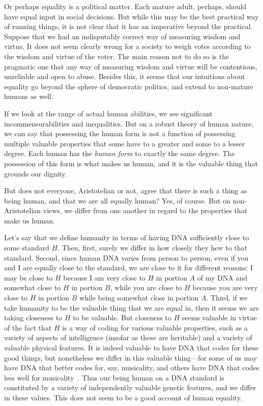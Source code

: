 Or perhaps equality is a political matter. Each mature adult, perhaps, should have equal 
input in social decisions. But while this may be the best practical way of running things, it is not
clear that it has an imperative beyond the practical. Suppose that we had an indisputably correct way
of measuring wisdom and virtue. It does not seem clearly wrong for a society to weigh votes according to 
the wisdom and virtue of the voter. The main reason not to do so is the pragmatic one that any way of
measuring wisdom and virtue will be contentious, unreliable and open to abuse.  Besides this, it seems 
that our intuitions about equality go beyond the sphere of democratic politics, and extend to non-mature
humans as well.

If we look at the range of actual human abilities, we see significant incommensurabilities and inequalities. But on a robust theory of human nature, we can say that possessing the human form is not a function of possessing multiple valuable properties that some have to a 
greater and some to a lesser degree. Each human has the \textit{human form} to exactly the same degree. The 
possession of this form is what makes us human, and it is the valuable thing that grounds our dignity. 

But does not everyone, Aristotelian or not, agree that there is such a thing as being human, and that we are all 
equally human? Yes, of course. But on non-Aristotelian views, we differ from one another in regard to the properties
that make us human. 

Let's say that we define humanity in terms of having DNA sufficiently close to some standard $H$.
Then, first, surely we differ in how closely they hew to that standard. Second, since human DNA varies from
person to person, even if you and I are equally close to the
standard, we are close to it for different reasons: I may be close to $H$ because I am very close to $H$ in portion $A$ of
my DNA and somewhat close to $H$ in portion $B$, while you are close to $H$ because you are very close to $H$ in portion
$B$ while being somewhat close in portion $A$. Third, if we take humanity to be the valuable thing that we are equal in,
then it seems we are taking closeness to $H$ to be valuable. But closeness to $H$ seems valuable in virtue of the fact
that $H$ is a way of coding for various valuable properties, such as a variety of aspects of intelligence (insofar as these
are heritable) and a variety of valuable physical features. It is indeed valuable to have DNA that codes for these good
things, but nonetheless we differ in this valuable thing---for some of us may have DNA that better codes for, say, musicality, and others have DNA that codes less well for musicality~\parencite{WAGUM}. Thus our being human on a DNA standard is constituted by a variety of independently valuable genetic features,
and we differ in these values. This does not seem to be a good account of human equality.

